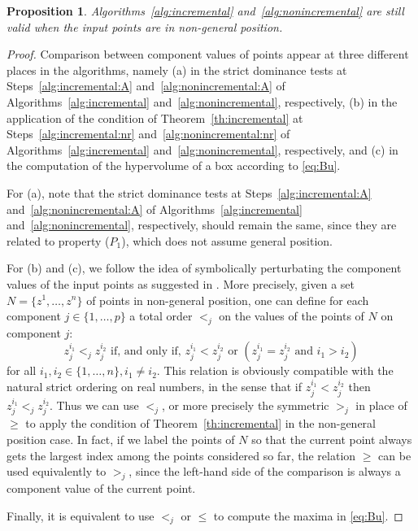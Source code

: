 \documentclass[a4paper,11pt]{article}
\newtheorem{proposition}[lemma]{Proposition}
\begin{document}
\begin{proposition}
  Algorithms~\ref{alg:incremental} and~\ref{alg:nonincremental} 
  are still valid when the input points are in non-general position.
\end{proposition}


\begin{proof}
Comparison between component values of points appear at three different places in the algorithms,
namely 
(a) in the strict dominance tests at Steps~\ref{alg:incremental:A} and~\ref{alg:nonincremental:A} 
of  Algorithms~\ref{alg:incremental} and~\ref{alg:nonincremental}, respectively,
(b) in the application of the condition of Theorem~\ref{th:incremental} at Steps~\ref{alg:incremental:nr}
and~\ref{alg:nonincremental:nr} of  Algorithms~\ref{alg:incremental} and~\ref{alg:nonincremental}, respectively, and 
(c) in the computation of the hypervolume of a box according to \eqref{eq:Bu}.

For (a), note that the strict dominance tests at Steps~\ref{alg:incremental:A}
and~\ref{alg:nonincremental:A} 
of  Algorithms~\ref{alg:incremental} and~\ref{alg:nonincremental}, respectively,
should remain the same,
since they are related to property ($P_1$), which does not assume general position.

For (b) and (c), we follow the idea of symbolically perturbating 
the component values of the input points
as suggested in \citet{KapRubShaVer08}.
More precisely, given a set $N = \{z^1, \dots, z^n\}$ of points in non-general position, 
one can define for each component $j \in \{1, \dots, p\}$ a total order $<_j$ 
on the values of the points of $N$ on component $j$:
$$z^{i_1}_j <_j z^{i_2}_j \text{ if, and only if, } z^{i_1}_j < z^{i_2}_j 
\text{ or } (z^{i_1}_j = z^{i_2}_j \text{ and } i_1 > i_2)$$
for all $i_1, i_2 \in \{1, \dots, n\}, i_1 \neq i_2$.
This relation is obviously compatible with the natural strict ordering on real numbers, 
in the sense that if $z^{i_1}_j < z^{i_2}_j$ then $z^{i_1}_j <_j z^{i_2}_j$.
Thus we can use $<_j$, or more precisely the symmetric $>_j$ 
in place of $\geq$ to apply the condition of Theorem~\ref{th:incremental} in the non-general position case.
In fact, if we label the points of $N$ so that the current point 
always gets the largest index among the points considered so far, 
the relation $\geq$ can be used equivalently to $>_j$, 
since the left-hand side of the comparison is always a component value of the current point.

Finally, it is equivalent to use $<_j$ or $\leq$ to compute the maxima in \eqref{eq:Bu}.
\end{proof}
\end{document}
